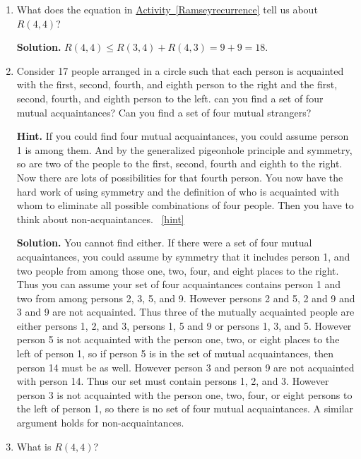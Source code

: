 \documentclass{book}
\begin{document}
\setcounter{project}{53}
\addtocounter{project}{-1}
\begin{activity}[]\label{Ramseybound2}
\leavevmode%
\begin{enumerate}[font=\bfseries,label=(\alph*),ref=\alph*]
\item\label{task-60} \hypertarget{p-438}{}%
What does the equation in \hyperref[Ramseyrecurrence]{Activity~\ref{Ramseyrecurrence}} tell us about \(R(4,4)\)?%
\par\smallskip%
\noindent\textbf{Solution.}\hypertarget{solution-40}{}\quad%
\hypertarget{p-439}{}%
\(R(4,4)\le R(3,4) + R(4,3) =9+9 = 18\).%
\item\label{task-61} \hypertarget{p-440}{}%
Consider 17 people arranged in a circle such that each person is acquainted with the first, second, fourth, and eighth person to the right and the first, second, fourth, and eighth person to the left.  can you find a set of four mutual acquaintances?  Can you find a set of four mutual strangers?%
\par\smallskip%
\noindent\textbf{Hint.}\hypertarget{hint-23}{}\quad%
\hypertarget{p-441}{}%
If you could find four mutual acquaintances, you could assume person 1 is among them. And by the generalized pigeonhole principle and symmetry, so are two of the people to the first, second, fourth and eighth to the right. Now there are lots of possibilities for that fourth person. You now have the hard work of using symmetry and the definition of who is acquainted with whom to eliminate all possible combinations of four people. Then you have to think about non-acquaintances.%
~\hfill{\tiny\hyperlink{a-53.b}{[hint]}\hypertarget{q-53.b}{}}\par\smallskip%
\noindent\textbf{Solution.}\hypertarget{solution-41}{}\quad%
\hypertarget{p-442}{}%
You cannot find either. If there were a set of four mutual acquaintances, you could assume by symmetry that it includes person 1, and two people from among those one, two, four, and eight places to the right. Thus you can assume your set of four acquaintances contains person 1 and two from among persons 2, 3, 5, and 9. However persons 2 and 5, 2 and 9 and 3 and 9 are not acquainted. Thus three of the mutually acquainted people are either persons 1, 2, and 3, persons 1, 5 and 9 or persons 1, 3, and 5. However person 5 is not acquainted with the person one, two, or eight places to the left of person 1, so if person 5 is in the set of mutual acquaintances, then person 14 must be as well. However person 3 and person 9 are not acquainted with person 14. Thus our set must contain persons 1, 2, and 3. However person 3 is not acquainted with the person one, two, four, or eight persons to the left of person 1, so there is no set of four mutual acquaintances. A similar argument holds for non-acquaintances.%
\item\label{task-62} \hypertarget{p-443}{}%
What is \(R(4,4)\)?%
\end{enumerate}
\end{activity}

\clearpage
\end{document}
